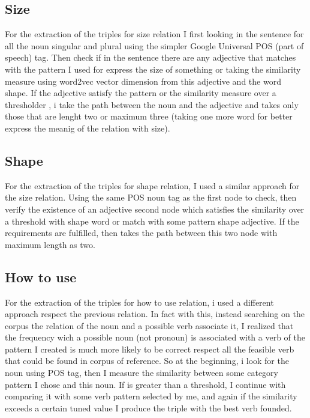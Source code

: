 \documentclass[conference,compsoc]{IEEEtran}
\begin{document}
\subsection{Size}
For the extraction of the triples for size relation I first looking in the sentence for all the noun singular and plural using the simpler Google Universal POS (part of speech) tag. Then check if in the sentence there are any adjective that matches with the pattern I used for express the size of something or taking the similarity measure using word2vec vector dimension from this adjective and the word shape.
If the adjective satisfy the pattern or the similarity measure over a thresholder , i take the path between the noun and the adjective and takes only those that are lenght two or maximum three (taking one more word for better express the meanig of the relation with size).

\subsection{Shape}
For the extraction of the triples for shape relation, I used a similar approach for the size relation. Using the same POS noun tag as the first node to check, then verify the existence of an adjective second node which satisfies the similarity over a threshold with shape word or match with some pattern shape adjective. If the requirements are fulfilled, then takes the path between this two node with maximum length as two. \\


\subsection{How to use}
For the extraction of the triples for how to use relation, i used a different approach respect the previous relation. In fact with this, instead searching on the corpus the relation of the noun and a possible verb associate it, I realized that the frequency wich a possible noun (not pronoun) is associated with a verb of the pattern I created is much more likely to be correct respect all the feasible verb that could be found in corpus of reference. So at the beginning, i look for the noun using POS tag, then I measure the similarity between some category pattern I chose and this noun. If is greater than a threshold, I continue with comparing it with some verb pattern selected by me, and again if the similarity exceeds a certain tuned value I produce the triple with the best verb founded. \\
\end{document}
